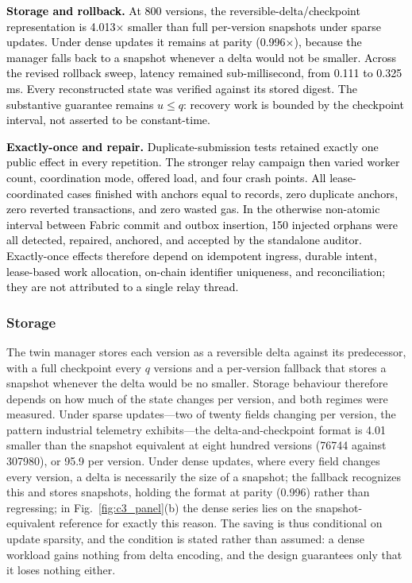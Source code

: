 \documentclass[final,5p,times,twocolumn]{elsarticle}
\begin{document}
\textcolor{black}{\textbf{Storage and rollback.} At 800 versions, the reversible-delta/checkpoint representation is 4.013$\times$ smaller than full per-version snapshots under sparse updates. Under dense updates it remains at parity (0.996$\times$), because the manager falls back to a snapshot whenever a delta would not be smaller. Across the revised rollback sweep, latency remained sub-millisecond, from 0.111 to 0.325\,ms. Every reconstructed state was verified against its stored digest. The substantive guarantee remains $u\leq q$: recovery work is bounded by the checkpoint interval, not asserted to be constant-time.}

\textcolor{black}{\textbf{Exactly-once and repair.} Duplicate-submission tests retained exactly one public effect in every repetition. The stronger relay campaign then varied worker count, coordination mode, offered load, and four crash points. All lease-coordinated cases finished with anchors equal to records, zero duplicate anchors, zero reverted transactions, and zero wasted gas. In the otherwise non-atomic interval between Fabric commit and outbox insertion, 150 injected orphans were all detected, repaired, anchored, and accepted by the standalone auditor. Exactly-once effects therefore depend on idempotent ingress, durable intent, lease-based work allocation, on-chain identifier uniqueness, and reconciliation; they are not attributed to a single relay thread.}

\iffalse

\subsubsection*{\textbf{Storage}}
The twin manager stores each version as a reversible delta against its
predecessor, with a full checkpoint every $q$ versions and a per-version
fallback that stores a snapshot whenever the delta would be no smaller. Storage
behaviour therefore depends on how much of the state changes per version, and
both regimes were measured. Under sparse updates---two of twenty fields changing
per version, the pattern industrial telemetry exhibits---the delta-and-checkpoint
format is \SI{4.01}{\times} smaller than the snapshot equivalent at eight
hundred versions (\SI{76744}{\byte} against \SI{307980}{\byte}), or
\SI{95.9}{\byte} per version. Under dense updates, where every field changes
every version, a delta is necessarily the size of a snapshot; the fallback
recognizes this and stores snapshots, holding the format at parity
(\SI{0.996}{\times}) rather than regressing; in Fig.~\ref{fig:c3_panel}(b) the
dense series lies on the snapshot-equivalent reference for exactly this reason.
The saving is thus conditional on
update sparsity, and the condition is stated rather than assumed: a dense
workload gains nothing from delta encoding, and the design guarantees only that
it loses nothing either.
\end{document}
